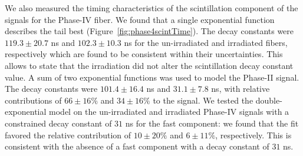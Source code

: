 \documentclass[a4paper,11pt]{article}
\begin{document}
We also measured the timing characteristics of the scintillation component of the signals for the Phase-IV fiber. We found that a single exponential function describes the tail best (Figure~\ref{fig:phase4scintTime}). The decay constants were $119.3 \pm 20.7$ ns and $102.3 \pm 10.3$ ns for the un-irradiated and irradiated fibers, respectively which are found to be consistent within their uncertainties. This allows to state that the irradiation did not alter the scintillation decay constant value. A sum of two exponential functions was used to model the Phase-II signal. The decay constants were $101.4 \pm 16.4$ ns and $31.1  \pm 7.8$ ns, with relative contributions of $66 \pm 16 \%$ and $34 \pm 16 \%$ to the signal. We tested the double-exponential model on the un-irradiated and irradiated Phase-IV signals with a constrained decay constant of $31$ ns for the fast component: we found that the fit favored the relative contribution of $10 \pm 20\%$ and $6 \pm 11\%$, respectively. This is consistent with the absence of a fast component with a decay constant of $31$ ns.
\end{document}
